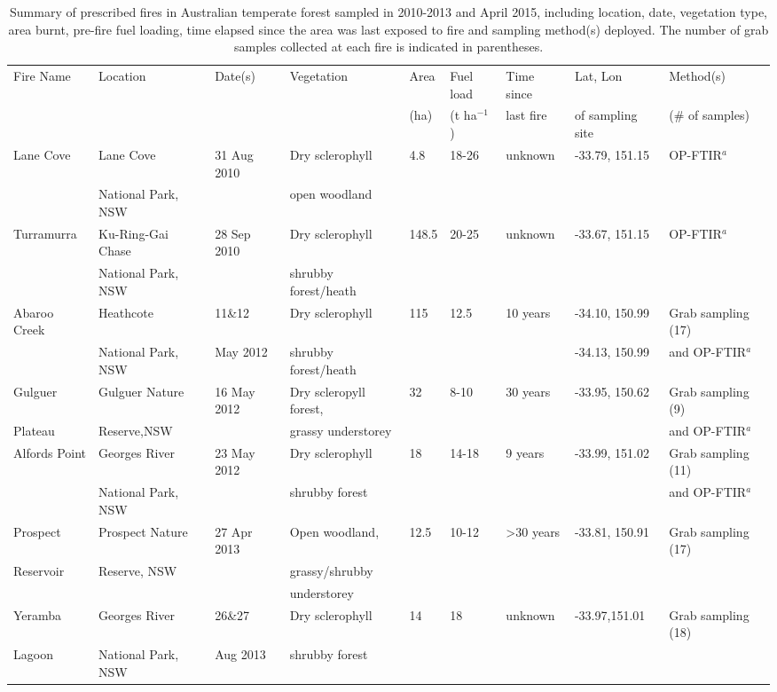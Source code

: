 \documentclass[acp, manuscript]{copernicus}
\begin{document}
\begin{sidewaystable}
\caption{Summary of prescribed fires in Australian temperate forest sampled in 2010-2013 and April 2015, including location, date, vegetation type, area burnt, pre-fire fuel loading, time elapsed since the area was last exposed to fire and sampling method(s) deployed. The number of grab samples collected at each fire is indicated in parentheses.}
\centering
 \begin{tabular}{l l l l  l l l l l }
    \tophline
 Fire Name & Location & Date(s) & Vegetation & Area & Fuel load & Time since & Lat, Lon & Method(s) \\
 & & & &(ha) &(t ha$^{-1}$)&last fire&of sampling site&(\# of samples)\\
 \hline
 Lane Cove &Lane Cove &31 Aug 2010&Dry sclerophyll&4.8&18-26&unknown&-33.79, 151.15&OP-FTIR$^a$\\
 &National Park, NSW&&open woodland&&&&&\\
 Turramurra &Ku-Ring-Gai Chase &28 Sep 2010&Dry sclerophyll&148.5&20-25&unknown&-33.67, 151.15&OP-FTIR$^a$\\
 &National Park, NSW&&shrubby forest/heath&&&&&\\
 Abaroo Creek&Heathcote &11\&12&Dry sclerophyll&115&12.5&10 years&-34.10, 150.99& Grab sampling (17)\\
 &National Park, NSW&May 2012&shrubby forest/heath&&&&-34.13, 150.99&and OP-FTIR$^a$\\
 Gulguer &Gulguer Nature &16 May 2012&Dry scleropyll forest,&32&8-10&30 years&-33.95, 150.62&Grab sampling (9)\\
 Plateau &Reserve,NSW&&grassy understorey&&&&&and OP-FTIR$^a$\\
 Alfords Point&Georges River &23 May 2012&Dry sclerophyll&18&14-18&9 years&-33.99, 151.02& Grab sampling (11)\\
 &National Park, NSW&&shrubby forest&&&&&and OP-FTIR$^a$\\
 Prospect &Prospect Nature&27 Apr 2013&Open woodland,&12.5&10-12&>30 years&-33.81, 150.91&Grab sampling (17)\\
 Reservoir& Reserve, NSW&&grassy/shrubby&&&&&\\
 &&&understorey&&&&&\\
 Yeramba &Georges River &26\&27 &Dry sclerophyll&14&18&unknown&-33.97,151.01&Grab sampling (18)\\
 Lagoon&National Park, NSW&Aug 2013&shrubby forest&&&&&\\

\end{tabular}
\end{sidewaystable}
\end{document}
